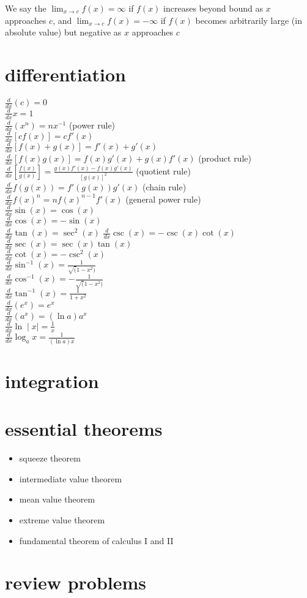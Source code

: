 \documentclass{article}
\begin{document}
	We say the $\lim_{x \to c}f(x) = \infty$ if $f(x)$ increases beyond bound as $x$ approaches $c$, and $\lim_{x \to c}f(x) = -\infty$ if $f(x)$ becomes arbitrarily large (in absolute value) but negative as $x$ approaches $c$

\section*{differentiation}
$\frac{d}{dx}(c) = 0$\\
$\frac{d}{dx}x = 1$\\
$\frac{d}{dx}(x^n) = nx^{-1}$ (power rule)\\
$\frac{d}{dx}[cf(x)] = cf'(x)$\\
$\frac{d}{dx}[f(x)+g(x)] = f'(x) + g'(x)$\\
$\frac{d}{dx}[f(x)g(x)] = f(x)g'(x) + g(x)f'(x)$ (product rule)\\
$\frac{d}{dx}[\frac{f(x)}{g(x)}] = \frac{g(x)f'(x) - f(x)g'(x)}{[g(x)]^2}$ (quotient rule)\\
$\frac{d}{dx}f(g(x)) = f'(g(x))g'(x)$ (chain rule)\\
$\frac{d}{dx}f(x)^n = nf(x)^{n-1}f'(x)$ (general power rule)\\
$\frac{d}{dx}\sin(x) = \cos(x)$\\ 
$\frac{d}{dx}\cos(x) = -\sin(x)$\\
$\frac{d}{dx}\tan(x) = \sec^2(x)$
$\frac{d}{dx}\csc(x) = -\csc(x)\cot(x)$\\
$\frac{d}{dx}\sec(x) = \sec(x)\tan(x)$\\
$\frac{d}{dx}\cot(x) = -\csc^2(x)$\\
$\frac{d}{dx}\sin^{-1}(x) = \frac{1}{\sqrt(1 - x^2)}$\\
$\frac{d}{dx}\cos^{-1}(x) = -\frac{1}{\sqrt(1 - x^2)}$\\
$\frac{d}{dx}\tan^{-1}(x) = \frac{1}{1 + x^2}$\\
$\frac{d}{dx}(e^x) = e^x$\\
$\frac{d}{dx}(a^x) = (\ln a)a^x$\\
$\frac{d}{dx}\ln\mid x\mid = \frac{1}{x}$\\
$\frac{d}{dx}\log_ax = \frac{1}{(\ln a)x}$\\

\section*{integration}



\section*{essential theorems}
	\begin{itemize}
		\item squeeze theorem
		\item intermediate value theorem
		\item mean value theorem
		\item extreme value theorem
		\item fundamental theorem of calculus I and II
	\end{itemize}

\newpage
\section*{review problems}
\end{document}
